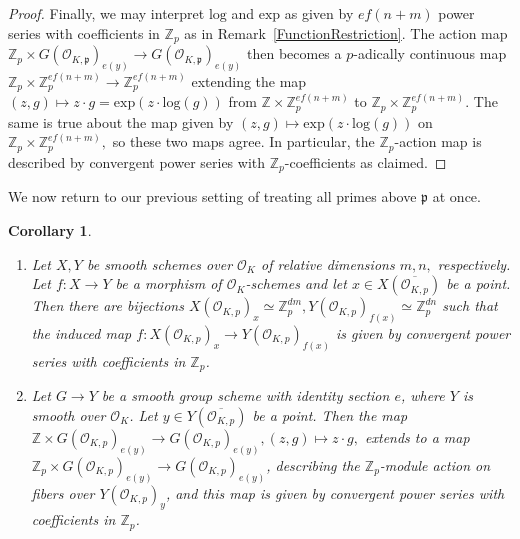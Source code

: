 \documentclass[11pt,oneside]{amsart}
\theoremstyle{plain}
\newtheorem{corollary}[theorem]{Corollary}
\theoremstyle{definition}
\def\Z{\mathbb{Z}}
\def\oh{\mathcal{O}}
\begin{document}
\begin{proof}
Finally, we may interpret $\mathrm{log}$ and $\mathrm{exp}$ as given by $ef(n+m)$ power series with coefficients in $\Z_p$ as in Remark~\ref{FunctionRestriction}. The action map $\Z_p \times G(\oh_{K, \mathfrak{p}})_{e(y)} \rightarrow G(\oh_{K, \mathfrak{p}})_{e(y)}$ then becomes a $p$-adically continuous map $\Z_p \times \Z_p^{ef(n+m)}\rightarrow \Z_p^{ef(n+m)}$ extending the map $(z, g)\mapsto z\cdot g=\mathrm{exp}(z \cdot \mathrm{log}(g))$ from $\Z \times \Z_{p}^{ef(n+m)}$ to $\Z_p \times \Z_{p}^{ef(n+m)}$. The same is true about the map given by $(z, g)\mapsto \mathrm{exp}(z \cdot \mathrm{log}(g))$ on $\Z_p \times \Z_{p}^{ef(n+m)},$ so these two maps agree. In particular, the $\Z_p$-action map is described by convergent power series with $\Z_p$-coefficients as claimed.
\end{proof}


We now return to our previous setting of treating all primes above $\mathfrak{p}$ at once.

\begin{corollary}\label{cor:AllPrimesInterpolation}
\begin{enumerate}
\item{Let $X, Y$ be smooth schemes over $\oh_K$ of relative dimensions $m, n,$ respectively. Let $f: X \rightarrow Y$ be a morphism of $\oh_K$-schemes and let $x \in X(\overline{\oh_{K,p}})$ be a point. Then there are bijections $X(\oh_{K,p})_x \simeq \Z_p^{dm}, Y(\oh_{K,p})_{f(x)} \simeq \Z_p^{dn}$ such that the induced map $f:X(\oh_{K, p})_x \rightarrow Y(\oh_{K, p})_{f(x)}$ is given by convergent power series with coefficients in $\Z_p$.}
\item{Let $G\rightarrow Y$ be a smooth group scheme with identity section $e$, where $Y$ is smooth over $\oh_K$. Let $y \in Y(\overline{\oh_{K, p}})$ be a point. Then the map $\mathbb{Z} \times G(\oh_{K, p})_{e(y)}\rightarrow G(\oh_{K, p})_{e(y)}, (z, g) \mapsto z \cdot g,$ extends to a map $\mathbb{Z}_p \times G(\oh_{K, p})_{e(y)}\rightarrow G(\oh_{K, p})_{e(y)}$, describing the $\Z_p$-module action on fibers over $Y(\oh_{K, p})_y$, and this map is given by convergent power series with coefficients in $\Z_p$.}
\end{enumerate}
\end{corollary}
\end{document}
